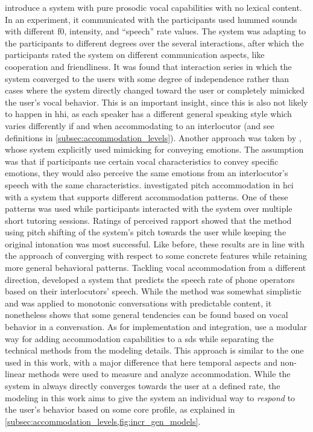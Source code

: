 \citet{Suzuki2003effects} introduce a system with pure prosodic vocal capabilities with no lexical content.
In an experiment, it communicated with the participants used hummed sounds with different \acf{f0}, intensity, and \enquote{speech} rate values.
The system was adapting to the participants to different degrees over the several interactions, after which the participants rated the system on different communication aspects, like cooperation and friendliness.
It was found that interaction series in which the system converged to the users with some degree of independence rather than cases where the system directly changed toward the user or completely mimicked the user's vocal behavior.
This is an important insight, since this is also not likely to happen in \ac{hhi}, as each speaker has a different general speaking style which varies differently if and when accommodating to an interlocutor (and see definitions in \cref{subsec:accommodation_levels}).
Another approach was taken by \citet{Acosta2011achieving}, whose system explicitly used mimicking for conveying emotions.
The assumption was that if participants use certain vocal characteristics to convey specific emotions, they would also perceive the same emotions from an interlocutor's speech with the same characteristics.
\citet{Lubold2015naturalness} investigated pitch accommodation in \ac{hci} with a system that supports different accommodation patterns.
One of these patterns was used while participants interacted with the system over multiple short tutoring sessions.
Ratings of perceived rapport showed that the method using pitch shifting of the system's pitch towards the user while keeping the original intonation was most successful.
Like before, these results are in line with the approach of converging with respect to some concrete features while retaining more general behavioral patterns.
Tackling vocal accommodation from a different direction, \citet{Ward2004automatic} developed a system that predicts the speech rate of phone operators based on their interlocutors' speech.
While the method was somewhat simplistic and was applied to monotonic conversations with predictable content, it nonetheless shows that some general tendencies can be found based on vocal behavior in a conversation.
As for implementation and integration, \citet{Levitan2016implementing} use a modular way for adding accommodation capabilities to a \ac{sds} while separating the technical methods from the modeling details.
This approach is similar to the one used in this work, with a major difference that here temporal aspects and non-linear methods were used to measure and analyze accommodation.
While the system in \citet{Levitan2016implementing} always directly converges towards the user at a defined rate, the modeling in this work aims to give the system an individual way to \emph{respond} to the user's behavior based on some core profile, as explained in \cref{subsec:accommodation_levels,fig:incr_gen_models}.

